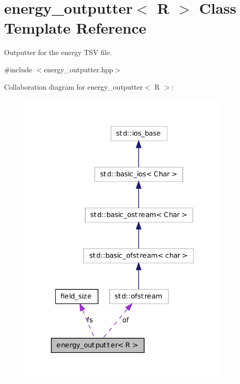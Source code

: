 \hypertarget{classenergy__outputter}{
\section{energy\_\-outputter$<$ R $>$ Class Template Reference}
\label{classenergy__outputter}
}


Outputter for the energy TSV file.  




{\ttfamily \#include $<$energy\_\-outputter.hpp$>$}



Collaboration diagram for energy\_\-outputter$<$ R $>$:
\nopagebreak
\begin{figure}[H]
\begin{center}
\leavevmode
\includegraphics[width=290pt]{classenergy__outputter__coll__graph}
\end{center}
\end{figure}

